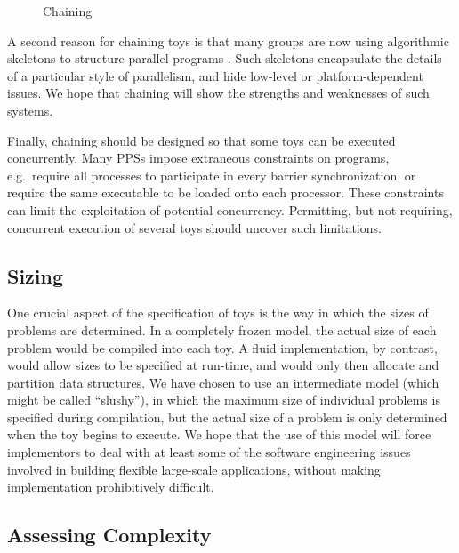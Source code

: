 \begin{figure}
\caption{Chaining\label{f:chaining}}
\end{figure}

A second reason for chaining toys is that
many groups are now using algorithmic skeletons to structure parallel programs
\cite{b:cole-skel,b:p3l-overview,b:enterprise}.
Such skeletons encapsulate the details of a particular style of parallelism,
and hide low-level or platform-dependent issues.
We hope that chaining will show the strengths and weaknesses of such systems.

Finally,
chaining should be designed so that some toys can be executed concurrently.
Many PPSs impose extraneous constraints on programs,
e.g.\ require all processes to participate in every barrier synchronization,
or require the same executable to be loaded onto each processor.
These constraints can limit the exploitation of potential concurrency.
Permitting, but not requiring, concurrent execution of several toys should uncover such limitations.

\subsection{Sizing\label{s:method-size}}

One crucial aspect of the specification of toys is
the way in which the sizes of problems are determined.
In a completely frozen model, the actual size of each problem would be compiled into each toy.
A fluid implementation, by contrast, would allow sizes to be specified at run-time,
and would only then allocate and partition data structures.
We have chosen to use an intermediate model (which might be called ``slushy''),
in which the maximum size of individual problems is specified during compilation,
but the actual size of a problem is only determined when the toy begins to execute.
We hope that the use of this model will force implementors to deal with
at least some of the software engineering issues
involved in building flexible large-scale applications,
without making implementation prohibitively difficult.

\subsection{Assessing Complexity\label{s:method-complex}}

